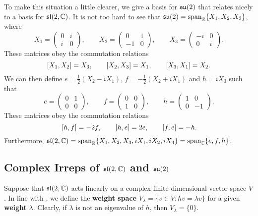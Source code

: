 \documentclass[a4paper]{article}
\begin{document}
To make this situation a little clearer, we give a basis for $\mathfrak{su}(2)$ that relates nicely to a basis for $\mathfrak{sl}(2, \mathbb{C})$. It is not too hard to see that $\mathfrak{su}(2) = \text{span}_{\mathbb{R}}\{X_1, X_2, X_3\}$, where
$$X_1 = \begin{pmatrix}0 & i \\ i & 0\end{pmatrix}, \hspace{2em} X_2 = \begin{pmatrix}0 & 1 \\ -1 & 0\end{pmatrix}, \hspace{2em} X_3 = \begin{pmatrix}-i & 0 \\ 0 & i\end{pmatrix}.$$
These matrices obey the commutation relations
$$ \left[ X_1, X_2 \right] = X_3, \hspace{2em} \left[ X_2, X_3 \right] = X_1, \hspace{2em} \left[ X_3, X_1 \right] = X_2.$$
We can then define ${e} = \frac{1}{2}(X_2 - iX_1)$, ${f} = -\frac{1}{2}(X_2 + iX_1)$ and ${h} = iX_3$ such that
$${e} = \begin{pmatrix}0 & 1 \\ 0 & 0\end{pmatrix}, \hspace{2em} {f} = \begin{pmatrix}0 & 0 \\ 1 & 0\end{pmatrix}, \hspace{2em} {h} = \begin{pmatrix}1 & 0 \\ 0 & -1\end{pmatrix}.$$
These matrices obey the commutation relations
$$\left[ {h}, {f} \right] = -2{f}, \hspace{2em} \left[ {h}, {e} \right] = 2{e}, \hspace{2em} \left[ {f}, {e} \right] = -{h}.$$
Furthermore, $\mathfrak{sl}(2, \mathbb{C}) = \text{span}_{\mathbb{R}}\{X_1, X_2, X_3, iX_1, iX_2, iX_3\} = \text{span}_{\mathbb{C}}\{{e}, {f}, {h}\}$.

\subsection{Complex Irreps of \texorpdfstring{$\mathfrak{sl}(2, \mathbb{C})$}{sl(2, \C)} and \texorpdfstring{$\mathfrak{su}(2)$}{su(2))}}

Suppose that $\mathfrak{sl}(2, \mathbb{C})$ acts linearly on a complex finite dimensional vector space $V$. In line with \cite{taylor}, we define the \textbf{weight space} $V_\lambda = \{v \in V : {h}v = \lambda v\}$ for a given \textbf{weight} $\lambda$. Clearly, if $\lambda$ is not an eigenvalue of ${h}$, then $V_\lambda = \{0\}$.
\end{document}
